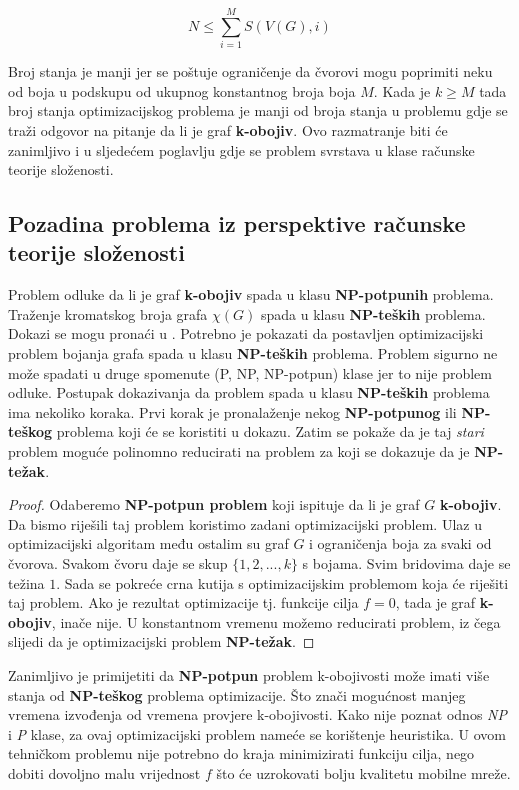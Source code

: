 \documentclass[times, utf8, diplomski, numeric]{fer}
\begin{document}
\begin{equation}
N \le \sum_{i=1}^{M} S(V(G), i)
\end{equation}

Broj stanja je manji jer se poštuje ograničenje da čvorovi mogu poprimiti neku od boja u podskupu od ukupnog konstantnog broja boja $M$. Kada je $k\ge M$ tada broj stanja optimizacijskog problema je manji od broja stanja u problemu gdje se traži odgovor na pitanje da li je graf \textbf{k-obojiv}. Ovo razmatranje biti će zanimljivo i u sljedećem poglavlju gdje se problem svrstava u klase računske teorije složenosti.

\subsection{Pozadina problema iz perspektive računske teorije složenosti}

Problem odluke da li je graf \textbf{k-obojiv} spada u klasu \textbf{NP-potpunih} problema. Traženje kromatskog broja grafa $\chi(G)$ spada u klasu \textbf{NP-teških} problema. Dokazi se mogu pronaći u \cite{Garey:1974:SNP:800119.803884}. Potrebno je pokazati da postavljen optimizacijski problem bojanja grafa spada u klasu \textbf{NP-teških} problema. Problem sigurno ne može spadati u druge spomenute (P, NP, NP-potpun) klase jer to nije problem odluke.
Postupak dokazivanja da problem spada u klasu \textbf{NP-teških} problema ima nekoliko koraka. Prvi korak je pronalaženje nekog \textbf{NP-potpunog} ili \textbf{NP-teškog} problema koji će se koristiti u dokazu. Zatim se pokaže da je taj \emph{stari} problem moguće polinomno reducirati na problem za koji se dokazuje da je \textbf{NP-težak}. 

\begin{proof}
Odaberemo \textbf{NP-potpun problem} koji ispituje da li je graf $G$ \textbf{k-obojiv}. Da bismo riješili taj problem koristimo zadani optimizacijski problem. Ulaz u optimizacijski algoritam među ostalim su graf $G$ i ograničenja boja za svaki od čvorova. Svakom čvoru daje se skup $\{1,2,...,k\}$ s bojama. Svim bridovima daje se težina $1$. Sada se pokreće crna kutija s optimizacijskim problemom koja će riješiti taj problem. Ako je rezultat optimizacije tj. funkcije cilja $f=0$, tada je graf \textbf{k-obojiv}, inače nije. U konstantnom vremenu možemo reducirati problem, iz čega slijedi da je optimizacijski problem \textbf{NP-težak}.  
\end{proof}

Zanimljivo je primijetiti da \textbf{NP-potpun} problem k-obojivosti može imati više stanja od \textbf{NP-teškog} problema optimizacije. Što znači mogućnost manjeg vremena izvođenja od vremena provjere k-obojivosti. Kako nije poznat odnos \emph{NP} i \emph{P} klase, za ovaj optimizacijski problem nameće se korištenje heuristika. U ovom tehničkom problemu nije potrebno do kraja minimizirati funkciju cilja, nego dobiti dovoljno malu vrijednost $f$ što će uzrokovati bolju kvalitetu mobilne mreže. 
\end{document}
